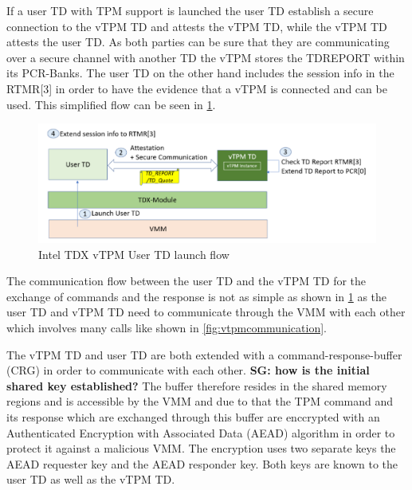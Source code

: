 \documentclass[sigplan,screen,nonacm]{acmart}
\newcommand{\sg}[1]{\textbf{SG: #1}}
\begin{document}
If a user TD with TPM support is launched the user TD establish a secure connection to the vTPM TD and attests the vTPM TD, while the vTPM TD attests the user TD.
As both parties can be sure that they are communicating over a secure channel with another TD the vTPM stores the TDREPORT within its PCR-Banks.
The user TD on the other hand includes the session info in the RTMR[3] in order to have the evidence that a vTPM is connected and can be used.
This simplified flow can be seen in \cref{fig:vtpmlaunchusertd}.

\begin{figure}
  \centering
  \includegraphics[width=\linewidth]{pictures/vTPM_TD_launch.png}
  \caption{Intel TDX vTPM User TD launch flow \cite{Intel-vTPM}}
  \label{fig:vtpmlaunchusertd}
\end{figure}

 The communication flow between the user TD and the vTPM TD for the exchange of commands and the response is not as simple as shown in \cref{fig:vtpmlaunchusertd} as the user TD and vTPM TD need to communicate through the VMM with each other which involves many calls like shown in \cref{fig:vtpmcommunication}.

The vTPM TD and user TD are both extended with a command-response-buffer (CRG) in order to communicate with each other.
\sg{how is the initial shared key established?}
The buffer therefore resides in the shared memory regions and is accessible by the VMM and due to that the TPM command and its response which are exchanged through this buffer are enccrypted with an Authenticated Encryption with Associated Data (AEAD) algorithm in order to protect it against a malicious VMM.
The encryption uses two separate keys the AEAD requester key and the AEAD responder key.
Both keys are known to the user TD as well as the vTPM TD.
\end{document}
